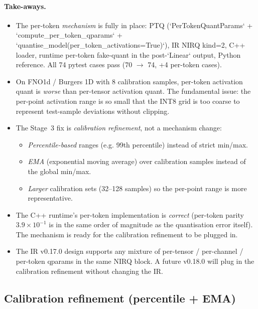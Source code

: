 \documentclass[10pt,twocolumn]{article}
\renewcommand{\texttt}[1]{{\normalfont\ttfamily #1}\normalfont\rmfamily}
\begin{document}
\paragraph{Take-aways.}
\begin{itemize}
\item The per-token \emph{mechanism} is fully in
place: PTQ (`PerTokenQuantParams` +
`compute_per_token_qparams` +
`quantise_model(per_token_activations=True)`), IR
NIRQ \texttt{kind=2}, C{++} loader, runtime
per-token fake-quant in the post-`Linear` output,
Python reference.  All 74 pytest cases pass
(70 $\to$ 74, +4 per-token cases).
\item On FNO1d / Burgers 1D with 8 calibration
samples, per-token activation quant is
\emph{worse} than per-tensor activation quant.  The
fundamental issue: the per-point activation range
is so small that the INT8 grid is too coarse to
represent test-sample deviations without clipping.
\item The Stage~3 fix is \emph{calibration
refinement}, not a mechanism change:
\begin{itemize}
\item \emph{Percentile-based} ranges (e.g. 99th
percentile) instead of strict min/max.
\item \emph{EMA} (exponential moving average) over
calibration samples instead of the global min/max.
\item \emph{Larger} calibration sets (32--128
samples) so the per-point range is more
representative.
\end{itemize}
\item The C{++} runtime's per-token implementation is
\emph{correct} (per-token parity $3.9 \times 10^{-1}$
is in the same order of magnitude as the
quantisation error itself).  The mechanism is ready
for the calibration refinement to be plugged in.
\item The IR v0.17.0 design supports any mixture of
per-tensor / per-channel / per-token qparams in the
same NIRQ block.  A future v0.18.0 will plug in the
calibration refinement without changing the IR.
\end{itemize}

\subsection{Calibration refinement (percentile + EMA)}
\label{sec:int8-calib-refinement}
\end{document}

